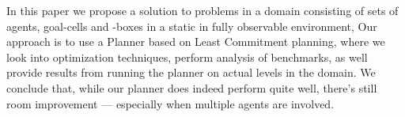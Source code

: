 \documentclass[Main]{subfiles}
\begin{document}

In this paper we propose a solution to problems in a domain consisting of sets of agents, goal-cells and -boxes in a static in fully observable environment,
Our approach is to use a Planner based on Least Commitment planning, where we look into optimization techniques, perform analysis of benchmarks, as well provide results from running the planner on actual levels in the domain.
We conclude that, while our planner does indeed perform quite well, there's still room improvement --- especially when multiple agents are involved.

\end{document}
